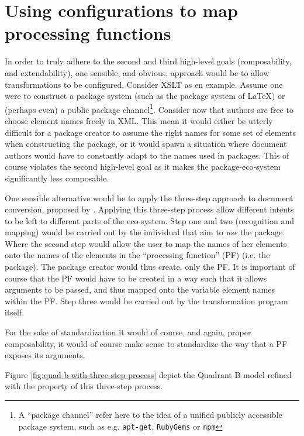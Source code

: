 \documentclass{scrreprt}
\begin{document}
\section{Using configurations to map processing functions}
\label{sec:applying-three-step-model-to-quad-b}
In order to truly adhere to the second and third high-level goals (composability, and extendability), one sensible, and obvious, approach would be to allow transformations to be configured. Consider XSLT as en example. Assume one were to construct a package system (such as the package system of \LaTeX) or (perhaps even) a public package channel\footnote{A ``package channel'' refer here to the idea of a unified publicly accessible package system, such as e.g. \texttt{apt-get}, \texttt{RubyGems} or \texttt{npm}}. Consider now that authors are free to choose element names freely in XML. This mean it would either be utterly difficult for a package creator to assume the right names for some set of elements when constructing the package, or it would spawn a situation where document authors would have to constantly adapt to the names used in packages. This of course violates the second high-level goal as it makes the package-eco-system significantly less composable.

One sensible alternative would be to apply the three-step approach to document conversion, proposed by \citet{goldfarb}. Applying this three-step process allow different intents to be left to different parts of the eco-system. Step one and two (recognition and mapping) would be carried out by the individual that aim to \emph{use} the package. Where the second step would allow the user to map the names of her elements onto the names of the elements in the ``processing function'' (PF) (i.e. the package). The package creator would thus create, only the PF. It is important of course that the PF would have to be created in a way such that it allows arguments to be passed, and thus mapped onto the variable element names within the PF.  Step three would be carried out by the transformation program itself.

For the sake of standardization it would of course, and again, proper composability, it would of course make sense to standardize the way that a PF exposes its arguments.

Figure \ref{fig:quad-b-with-three-step-process} depict the Quadrant B model refined with the property of this three-step process.
\end{document}
